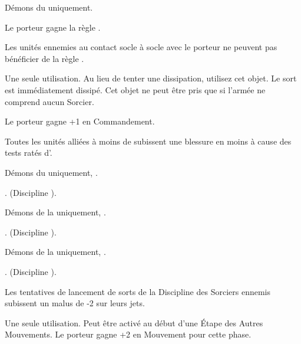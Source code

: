 \newpage
\begin{multicols}{2}\raggedcolumns

\subtitle{Objets enchantés démoniaques}\vspace{5pt}

\startpricelist

Démons du \textbf{\dchange} uniquement.

Le porteur gagne la règle .

Les unités ennemies au contact socle à socle avec le porteur ne peuvent pas bénéficier de la règle \holdyourground{}.

Une seule utilisation. Au lieu de tenter une dissipation, utilisez cet objet. Le sort est immédiatement dissipé. Cet objet ne peut être pris que si l'armée ne comprend aucun Sorcier.

Le porteur gagne +1 en Commandement.

Toutes les unités alliées à moins de  subissent une blessure en moins à cause des tests ratés d'\daemonicinstability{}.

Démons du \textbf{\dchange} uniquement, \oneofakind{}.

. \changespelltwo{} (Discipline \change{}).

Démons de la \textbf{\dlust} uniquement, \oneofakind{}.

. \lustspellthree{} (Discipline \lust{}).

Démons de la \textbf{\pestilence} uniquement, \oneofakind{}.

. \diseasespelltwo{} (Discipline \disease{}).

Les tentatives de lancement de sorts de la Discipline \light{} des Sorciers ennemis subissent un malus de -2 sur leurs jets.

Une seule utilisation. Peut être activé au début d'une Étape des Autres Mouvements. Le porteur gagne +2 en Mouvement pour cette phase.

\endpricelist

\subtitle{Objets cabalistiques démoniaques}\vspace{5pt}


\end{multicols}

